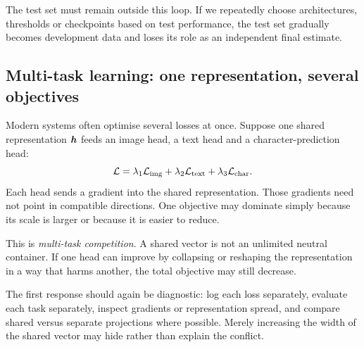 The test set must remain outside this loop. If we repeatedly choose architectures, thresholds or checkpoints based on test performance, the test set gradually becomes development data and loses its role as an independent final estimate.

\subsection{Multi-task learning: one representation, several objectives}

Modern systems often optimise several losses at once. Suppose one shared representation \(\bm{h}\) feeds an image head, a text head and a character-prediction head:
\[
  \mathcal{L} = \lambda_1\mathcal{L}_{\mathrm{img}}
        + \lambda_2\mathcal{L}_{\mathrm{text}}
        + \lambda_3\mathcal{L}_{\mathrm{char}}.
\]
Each head sends a gradient into the shared representation. Those gradients need not point in compatible directions. One objective may dominate simply because its scale is larger or because it is easier to reduce.

This is \emph{multi-task competition}. A shared vector is not an unlimited neutral container. If one head can improve by collapsing or reshaping the representation in a way that harms another, the total objective may still decrease.

The first response should again be diagnostic: log each loss separately, evaluate each task separately, inspect gradients or representation spread, and compare shared versus separate projections where possible. Merely increasing the width of the shared vector may hide rather than explain the conflict.

